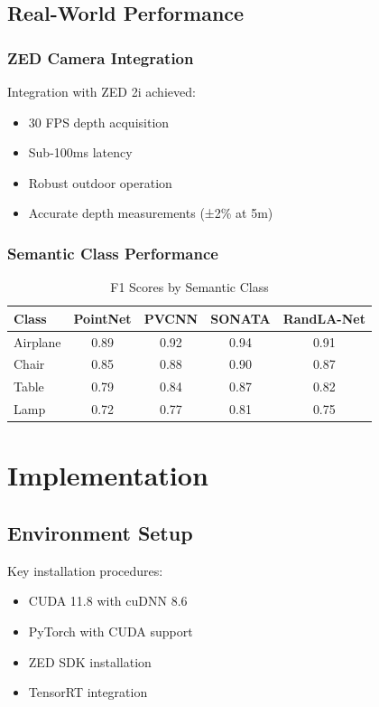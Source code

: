 \documentclass[12pt,a4paper]{report}
\begin{document}
\section{Real-World Performance}

\subsection{ZED Camera Integration}

Integration with ZED 2i achieved:
\begin{itemize}
    \item 30 FPS depth acquisition
    \item Sub-100ms latency
    \item Robust outdoor operation
    \item Accurate depth measurements (±2\% at 5m)
\end{itemize}

\subsection{Semantic Class Performance}

\begin{table}[htbp]
\centering
\caption{F1 Scores by Semantic Class}
\label{tab:class_performance}
\begin{tabular}{@{}lcccc@{}}
\toprule
\textbf{Class} & \textbf{PointNet} & \textbf{PVCNN} & \textbf{SONATA} & \textbf{RandLA-Net} \\
\midrule
Airplane & 0.89 & 0.92 & 0.94 & 0.91 \\
Chair & 0.85 & 0.88 & 0.90 & 0.87 \\
Table & 0.79 & 0.84 & 0.87 & 0.82 \\
Lamp & 0.72 & 0.77 & 0.81 & 0.75 \\
\bottomrule
\end{tabular}
\end{table}

\chapter{Implementation}

\section{Environment Setup}

Key installation procedures:
\begin{itemize}
    \item CUDA 11.8 with cuDNN 8.6
    \item PyTorch with CUDA support
    \item ZED SDK installation
    \item TensorRT integration
\end{itemize}
\end{document}
